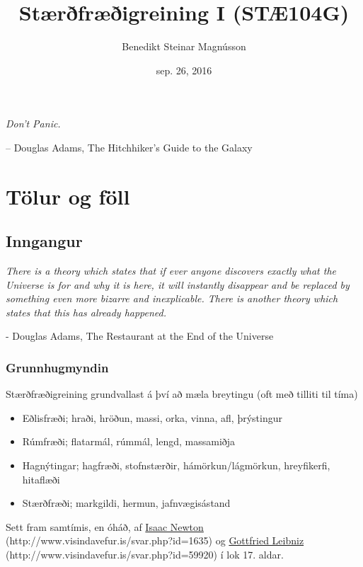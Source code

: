 \documentclass[b5paper,11pt,icelandic]{sphinxmanual}
\title{Stærðfræðigreining I (STÆ104G)}
\date{sep. 26, 2016}
\author{Benedikt Steinar Magnússon}
\begin{document}
\maketitle
\tableofcontents
\emph{Don't Panic.}

-- Douglas Adams, The Hitchhiker's Guide to the Galaxy
\label{index::doc}




\chapter{Tölur og föll}
\label{kafli01:tolur-og-foll}\label{kafli01:staerfraeigreining-i-stae104g-haskoli-islands-haust-2016}\label{kafli01::doc}

\section{Inngangur}
\label{kafli01:inngangur}
\emph{There is a theory which states that if ever anyone discovers exactly what the Universe is for and why it is here, it will instantly disappear and be replaced by something even more bizarre and inexplicable.
There is another theory which states that this has already happened.}

- Douglas Adams, The Restaurant at the End of the Universe


\subsection{Grunnhugmyndin}
\label{kafli01:grunnhugmyndin}
Stærðfræðigreining grundvallast á því að mæla breytingu (oft með tilliti
til tíma)
\begin{itemize}
\item {} 
Eðlisfræði; hraði, hröðun, massi, orka, vinna, afl, þrýstingur

\item {} 
Rúmfræði; flatarmál, rúmmál, lengd, massamiðja

\item {} 
Hagnýtingar; hagfræði, stofnstærðir, hámörkun/lágmörkun, hreyfikerfi, hitaflæði

\item {} 
Stærðfræði; markgildi, hermun, jafnvægisástand

\end{itemize}

Sett fram samtímis, en óháð, af
\href{http://www.visindavefur.is/svar.php?id=1635}{Isaac Newton} (http://www.visindavefur.is/svar.php?id=1635) og
\href{http://www.visindavefur.is/svar.php?id=59920}{Gottfried Leibniz} (http://www.visindavefur.is/svar.php?id=59920) í lok 17. aldar.
\end{document}
